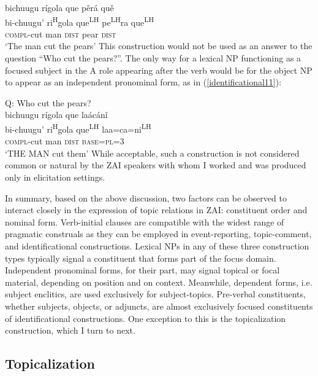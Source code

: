 \ea\label{identificational10} 
\glll bichuugu r\'{i}gola que p\v{e}r\'{a} qu\v{e}  \\
bi-chuugu' ri\textsuperscript{H}gola que\textsuperscript{LH} pe\textsuperscript{LH}ra que\textsuperscript{LH}  \\
\textsc{compl}-cut man \textsc{dist} pear \textsc{dist}  \\
\glt `The man cut the pears'
\z
This construction would not be used as an answer to the question ``Who cut the pears?''. The only way for a lexical NP functioning as a focused subject in the A role appearing after the verb would be for the object NP to appear as an independent pronominal form, as in (\ref{identificational11}):

\ea\label{identificational11}  
{Q: Who cut the pears?} \\
\glll bichuugu r\'{i}gola que la\'{a}c\'{a}n\v{i}  \\
bi-chuugu' ri\textsuperscript{H}gola que\textsuperscript{LH} laa=ca=ni\textsuperscript{LH}  \\
\textsc{compl}-cut man \textsc{dist} \textsc{base}=\textsc{pl}=\textsc{3}  \\
\glt `THE MAN cut them'
\z
While acceptable, such a construction is not considered common or natural by the ZAI speakers with whom I worked and was produced only in elicitation settings.

In summary, based on the above discussion, two factors can be observed to interact closely in the expression of topic relations in ZAI: constituent order and nominal form. Verb-initial clauses are compatible with the widest range of pragmatic construals as they can be employed in event-reporting, topic-comment, and identificational constructions. Lexical NPs in any of these three construction types typically signal a constituent that forms part of the focus domain. Independent pronominal forms, for their part, may signal topical or focal material, depending on position and on context. Meanwhile, dependent forms, i.e. subject enclitics, are used exclusively for subject-topics. Pre-verbal constituents, whether subjects, objects, or adjuncts, are almost exclusively focused constituents of identificational constructions. One exception to this is the topicalization construction, which I turn to next.


\subsection{Topicalization}\label{topicalizationsection}


